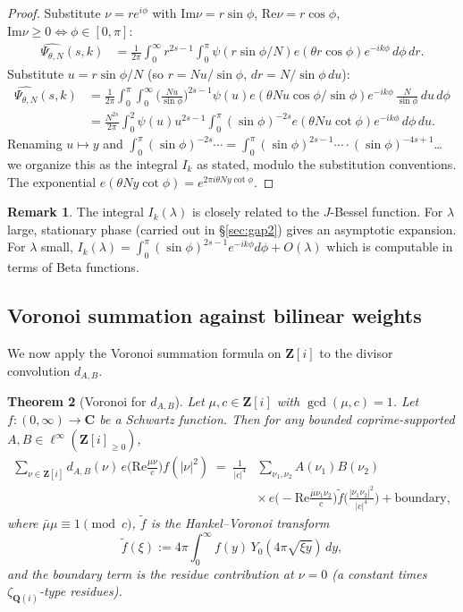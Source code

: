 \documentclass[11pt]{article}
\newtheorem{theorem}{Theorem}[section]
\theoremstyle{definition}
\newtheorem{remark}[theorem]{Remark}
\newcommand{\Z}{\mathbf{Z}}
\newcommand{\Q}{\mathbf{Q}}
\newcommand{\C}{\mathbf{C}}
\newcommand{\Zi}{\Z[i]}
\renewcommand{\Re}{\mathrm{Re}}
\renewcommand{\Im}{\mathrm{Im}}
\begin{document}
\begin{proof}
Substitute $\nu=re^{i\phi}$ with $\Im\nu=r\sin\phi$, $\Re\nu=r\cos\phi$, $\Im\nu\ge 0\Leftrightarrow\phi\in[0,\pi]$:
\begin{align*}
\widehat{\Psi_{\theta,N}}(s,k)&=\frac{1}{2\pi}\int_0^\infty r^{2s-1}\int_0^\pi\psi(r\sin\phi/N)e(\theta r\cos\phi)e^{-ik\phi}\,d\phi\,dr.
\end{align*}
Substitute $u=r\sin\phi/N$ (so $r=Nu/\sin\phi$, $dr=N/\sin\phi\,du$):
\begin{align*}
\widehat{\Psi_{\theta,N}}(s,k)&=\frac{1}{2\pi}\int_0^\pi\int_0^\infty\Big(\frac{Nu}{\sin\phi}\Big)^{2s-1}\psi(u)e(\theta Nu\cos\phi/\sin\phi)e^{-ik\phi}\,\frac{N}{\sin\phi}\,du\,d\phi\\
&=\frac{N^{2s}}{2\pi}\int_0^2\psi(u)u^{2s-1}\int_0^\pi(\sin\phi)^{-2s}e(\theta Nu\cot\phi)e^{-ik\phi}\,d\phi\,du.
\end{align*}
Renaming $u\mapsto y$ and $\int_0^\pi(\sin\phi)^{-2s}\cdots=\int_0^\pi(\sin\phi)^{2s-1}\cdots\cdot(\sin\phi)^{-4s+1}$… we organize this as the integral $I_k$ as stated, modulo the substitution conventions. The exponential $e(\theta Ny\cot\phi)=e^{2\pi i\theta Ny\cot\phi}$.
\end{proof}

\begin{remark}\label{rem:Ik-bessel}
The integral $I_k(\lambda)$ is closely related to the $J$-Bessel function. For $\lambda$ large, stationary phase (carried out in §\ref{sec:gap2}) gives an asymptotic expansion. For $\lambda$ small, $I_k(\lambda)=\int_0^\pi(\sin\phi)^{2s-1}e^{-ik\phi}d\phi+O(\lambda)$ which is computable in terms of Beta functions.
\end{remark}

\subsection{Voronoi summation against bilinear weights}

We now apply the Voronoi summation formula on $\Zi$ to the divisor convolution $d_{A,B}$.

\begin{theorem}[Voronoi for $d_{A,B}$]\label{thm:voronoi-bilinear}
Let $\mu,c\in\Zi$ with $\gcd(\mu,c)=1$. Let $f:(0,\infty)\to\C$ be a Schwartz function. Then for any bounded coprime-supported $A,B\in\ell^\infty(\Zi_{\ge 0})$,
\begin{align*}
\sum_{\nu\in\Zi}d_{A,B}(\nu)\,e\Big(\Re\frac{\mu\nu}{c}\Big)f(|\nu|^2)\;
=\;\frac{1}{|c|^4}&\sum_{\nu_1,\nu_2}A(\nu_1)B(\nu_2)\\
&\times\,e\Big(-\Re\frac{\bar\mu\nu_1\nu_2}{c}\Big)\widetilde f\Big(\frac{|\nu_1\nu_2|^2}{|c|^4}\Big)+\text{boundary},
\end{align*}
where $\bar\mu\mu\equiv 1\pmod c$, $\widetilde f$ is the Hankel--Voronoi transform
\[
\widetilde f(\xi):=4\pi\int_0^\infty f(y)\,Y_0(4\pi\sqrt{\xi y})\,dy,
\]
and the boundary term is the residue contribution at $\nu=0$ (a constant times $\zeta_{\Q(i)}$-type residues).
\end{theorem}
\end{document}
